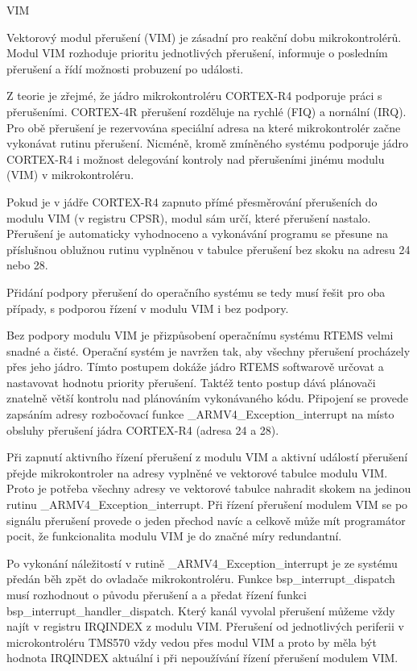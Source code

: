 \secc	VIM

Vektorový modul přerušení (VIM) je zásadní pro reakční dobu mikrokontrolérů. Modul VIM rozhoduje prioritu jednotlivých přerušení, informuje o posledním přerušení a řídí možnosti probuzení po události.

Z teorie je zřejmé, že jádro mikrokontroléru CORTEX-R4 podporuje práci s přerušeními. CORTEX-4R přerušení rozděluje na rychlé (FIQ) a nornální (IRQ). Pro obě přerušení je rezervována speciální adresa na které mikrokontrolér začne vykonávat rutinu přerušení. Nicméně, kromě zmíněného systému podporuje jádro CORTEX-R4 i možnost delegování kontroly nad přerušeními jinému modulu (VIM) v mikrokontroléru.

Pokud je v jádře CORTEX-R4 zapnuto přímé přesměrování přerušeních do modulu VIM (v registru CPSR), modul sám určí, které přerušení nastalo. Přerušení je automaticky vyhodnoceno a vykonávání programu se přesune na příslušnou oblužnou rutinu vyplněnou v tabulce přerušení bez skoku na adresu 24 nebo 28.

Přidání podpory přerušení do operačního systému se tedy musí řešit pro oba případy, s podporou řízení v modulu VIM i bez podpory.

Bez podpory modulu VIM je přizpůsobení operačnímu systému RTEMS velmi snadné a čisté. Operační systém je navržen tak, aby všechny přerušení procházely přes jeho jádro. Tímto postupem dokáže jádro RTEMS softwarově určovat a nastavovat hodnotu priority přerušení. Taktéž tento postup dává plánovači znatelně větší kontrolu nad plánováním vykonávaného kódu. Připojení se provede zapsáním adresy rozbočovací funkce \_ARMV4\_Exception\_interrupt na místo obsluhy přerušení jádra CORTEX-R4 (adresa 24 a 28).

Při zapnutí aktivního řízení přerušení z modulu VIM a aktivní událostí přerušení přejde mikrokontroler na adresy vyplněné ve vektorové tabulce modulu VIM. Proto je potřeba všechny adresy ve vektorové tabulce nahradit skokem na jedinou rutinu \_ARMV4\_Exception\_interrupt. Při řízení přerušení modulem VIM se po signálu přerušení provede o jeden přechod navíc a celkově může mít programátor pocit, že funkcionalita modulu VIM je do značné míry redundantní.

Po vykonání náležitostí v rutině \_ARMV4\_Exception\_interrupt je ze systému předán běh zpět do ovladače mikrokontroléru. Funkce bsp\_interrupt\_dispatch musí rozhodnout o původu přerušení a a předat řízení funkci bsp\_interrupt\_handler\_dispatch. Který kanál vyvolal přerušení můžeme vždy najít v registru IRQINDEX z modulu VIM. Přerušení od jednotlivých periferii v microkontroléru TMS570 vždy vedou přes modul VIM a proto by měla být hodnota IRQINDEX aktuální i při nepoužívání řízení přerušení modulem VIM.

